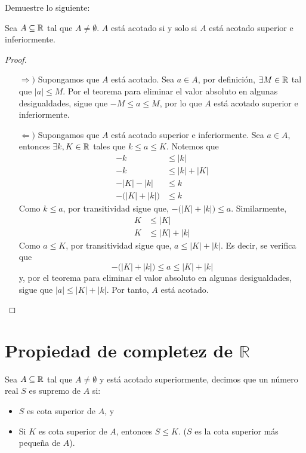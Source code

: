 Demuestre lo siguiente:

Sea $A\subseteq \mathbb{R}$ tal que $A\neq \emptyset$. $A$ está acotado si y solo si $A$ está acotado superior e inferiormente.
 
 \begin{proof} \leavevmode
  \begin{itemize}
   \item[$\Rightarrow)$] Supongamos que $A$ está acotado. Sea $a\in A$, por definición, $\exists M\in \mathbb{R}$ tal que $|a|\leq M$. Por el teorema para eliminar el valor absoluto en algunas desigualdades, sigue que $-M\leq a \leq M$, por lo que $A$ está acotado superior e inferiormente.
   \item[$\Leftarrow)$] Supongamos que $A$ está acotado superior e inferiormente. Sea $a\in A$, entonces $\exists k, K\in \mathbb{R}$ tales que $k\leq a \leq K$. Notemos que
   \begin{align*}
    -k &\leq |k|\\
    -k &\leq |k| + |K|\\
    -|K|-|k| &\leq k\\
    - \big(|K|+|k|\big) &\leq k
   \end{align*}
   Como $k\leq a$, por transitividad sigue que, $-\big(|K|+|k|\big) \leq a$. Similarmente,
   \begin{align*}
    K &\leq |K|\\
    K &\leq |K| + |k|
   \end{align*}
   Como $a\leq K$, por transitividad sigue que, $a\leq |K|+|k|$. Es decir, se verifica que \[-\big(|K|+|k|\big) \leq a \leq |K|+|k|\]
   y, por el teorema para eliminar el valor absoluto en algunas desigualdades, sigue que $|a| \leq |K| + |k|$. Por tanto, $A$ está acotado. \qedhere
  \end{itemize}
 \end{proof}
 
 \section*{Propiedad de completez de \(\mathbb{R}\)}

  Sea $A\subseteq \mathbb{R}$ tal que $A\neq \emptyset$ y está acotado superiormente, decimos que un número real $S$ es supremo de $A$ si:
\begin{itemize}
 \item $S$ es cota superior de $A$, y
 \item Si $K$ es cota superior de $A$, entonces $S\leq K$. ($S$ es la cota superior más pequeña de $A$).
\end{itemize}

